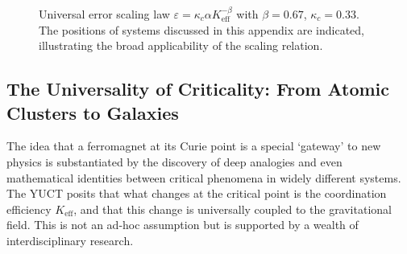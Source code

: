 \documentclass[12pt]{article}
\theoremstyle{remark}
\newcommand{\Keff}{K_{\mathrm{eff}}}
\newcommand{\eps}{\varepsilon}
\newcommand{\kappac}{\kappa_c}
\begin{document}
	\begin{figure}[htbp]
		\centering
		\caption{Universal error scaling law $\eps = \kappac \alpha \Keff^{-\beta}$ with $\beta=0.67$, $\kappac=0.33$. The positions of systems discussed in this appendix are indicated, illustrating the broad applicability of the scaling relation.}
		\label{fig:scaling}
	\end{figure}
	
	
	\subsection{The Universality of Criticality: From Atomic Clusters to Galaxies}
	\label{subsec:universality}
	
	The idea that a ferromagnet at its Curie point is a special `gateway' to new physics is
	substantiated by the discovery of deep analogies and even mathematical identities between
	critical phenomena in widely different systems. The YUCT posits that what changes at the
	critical point is the coordination efficiency \(K_{\mathrm{eff}}\), and that this change is
	universally coupled to the gravitational field. This is not an ad-hoc assumption but is
	supported by a wealth of interdisciplinary research.
	
\end{document}
